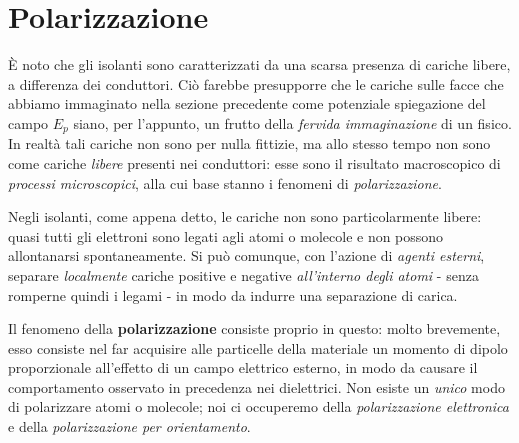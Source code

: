 \section{Polarizzazione}
È noto che gli isolanti sono caratterizzati da una scarsa presenza di cariche libere, a differenza dei conduttori. Ciò farebbe presupporre che le cariche sulle facce che abbiamo immaginato nella sezione precedente come potenziale spiegazione del campo $E_p$ siano, per l'appunto, un frutto della \textit{fervida immaginazione} di un fisico.\\
In realtà tali cariche non sono per nulla fittizie, ma allo stesso tempo non sono come cariche \textit{libere} presenti nei conduttori: esse sono il risultato macroscopico di \textit{processi microscopici}, alla cui base stanno i fenomeni di \textit{polarizzazione}.

Negli isolanti, come appena detto, le cariche non sono particolarmente libere: quasi tutti gli elettroni sono legati agli atomi o molecole e non possono allontanarsi spontaneamente. Si può comunque, con l'azione di \textit{agenti esterni}, separare \textit{localmente} cariche positive e negative \textit{all'interno degli atomi} - senza romperne quindi i legami - in modo da indurre una separazione di carica.

Il fenomeno della \textbf{polarizzazione} consiste proprio in questo: molto brevemente, esso consiste nel far acquisire alle particelle della materiale un momento di dipolo proporzionale all'effetto di un campo elettrico esterno, in modo da causare il comportamento osservato in precedenza nei dielettrici. Non esiste un \textit{unico} modo di polarizzare atomi o molecole; noi ci occuperemo della \textit{polarizzazione elettronica} e della \textit{polarizzazione per orientamento}.
